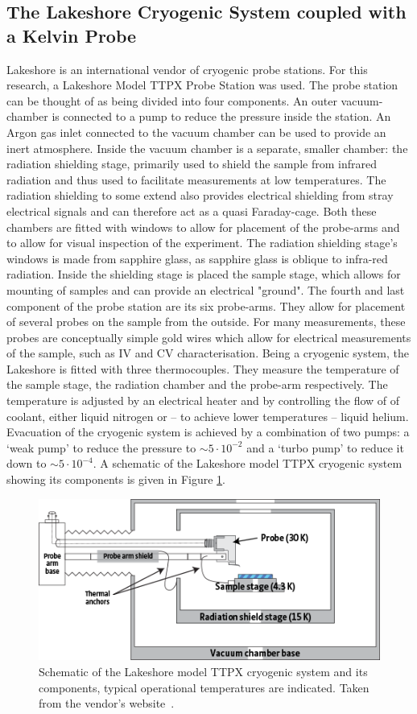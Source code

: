\subsection{The Lakeshore Cryogenic System coupled with a \McA{} Kelvin Probe}
Lakeshore is an international vendor of cryogenic probe stations. For this research, a Lakeshore Model TTPX Probe Station was used. The probe station can be thought of as being divided into four components. An outer vacuum-chamber is connected to a pump to reduce the pressure inside the station. An Argon gas inlet connected to the vacuum chamber can be used to provide an inert atmosphere. Inside the vacuum chamber is a separate, smaller chamber: the radiation shielding stage, primarily used to shield the sample from infrared radiation and thus used to facilitate measurements at low temperatures. The radiation shielding to some extend also provides electrical shielding from stray electrical signals and can therefore act as a quasi Faraday-cage. Both these chambers are fitted with windows to allow for placement of the probe-arms and to allow for visual inspection of the experiment. The radiation shielding stage's windows is made from sapphire glass, as sapphire glass is oblique to infra-red radiation. Inside the shielding stage is placed the sample stage, which allows for mounting of samples and can provide an electrical "ground". The fourth and last component of the probe station are its six probe-arms. They allow for placement of several probes on the sample from the outside. For many measurements, these probes are conceptually simple gold wires which allow for electrical measurements of the sample, such as IV and CV characterisation. Being a cryogenic system, the Lakeshore is fitted with three thermocouples. They measure the temperature of the sample stage, the radiation chamber and the probe-arm respectively. The temperature is adjusted by an electrical heater and by controlling the flow of of coolant, either liquid nitrogen or -- to achieve lower temperatures -- liquid helium. Evacuation of the cryogenic system is achieved by a combination of two pumps: a `weak pump' to reduce the pressure to $\sim 5\cdot 10^{-2}$ and a `turbo pump' to reduce it down to $\sim 5\cdot 10^{-4}$. A schematic of the Lakeshore model TTPX cryogenic system showing its components is given in Figure \ref{fig:McAscheme}.\\
\begin{figure}
\centering
	\includegraphics[width=0.8\linewidth]{./figs/Config_TTPX}
	\caption{Schematic of the Lakeshore model TTPX cryogenic system and its components, typical operational temperatures are indicated. Taken from the vendor's website~\cite{lakeshore}.}
	\label{fig:McAscheme}
\end{figure}
